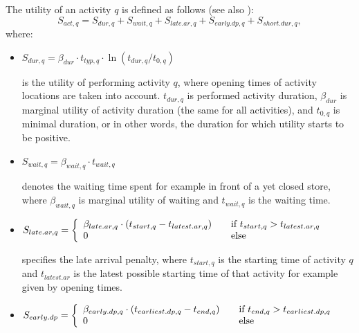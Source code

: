The utility of an activity $q$ is defined as follows (see also \citet[][p.377ff]{CharyparNagel_Transportation_2005}):
\begin{equation}
S_{act,q} = S_{dur,q} + S_{wait,q} + S_{late.ar,q} + S_{early.dp, q} + S_{short.dur, q},
\label{eq:matsimUTFact}
\end{equation}
where:
\begin{itemize}
\item $S_{dur,q}= \beta_{dur} \cdot t_{typ,q} \cdot \ln(t_{dur,q}/t_{0,q})$ 

is the utility of performing activity $q$, where opening times of activity locations are taken into account. $t_{dur,q}$ is performed activity duration, $\beta_{dur}$ is marginal utility of activity duration (the same for all activities),
and $t_{0,q}$ is minimal duration, or in other words, the duration for which utility starts to be positive. 


\item $ S_{wait,q} = \beta_{wait, q} \cdot t_{wait,q}$ 

denotes the waiting time spent for example in front of a yet closed store, where $\beta_{wait,q}$ is marginal utility of waiting and $t_{wait,q}$ is the waiting time.
		
\item $S_{late.ar,q}= \left\{
  \begin{array}{l l}
    \beta_{late.ar,q} \cdot (t_{start,q} - t_{latest.ar,q}) & \quad \text{if $t_{start,q} > t_{latest.ar,q}$}\\
    0 & \quad \text{else}
  \end{array} \right.$
  
  specifies the late arrival penalty, where $t_{start,q}$ is the starting time of activity $q$ and $t_{latest.ar}$ is the latest possible starting time of that activity for example given by opening times.

\item $S_{early.dp} = \left\{
  \begin{array}{l l}
    \beta_{early.dp,q} \cdot (t_{earliest.dp, q} - t_{end,q}) & \quad \text{if $t_{end,q} > t_{earliest.dp,q}$}\\
    0 & \quad \text{else}
  \end{array} \right.$


\end{itemize}
